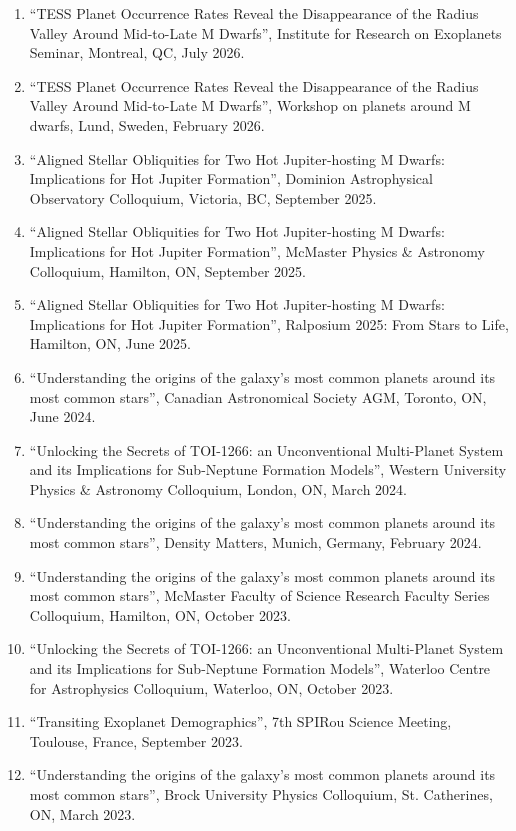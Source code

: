 \documentclass[12pt]{article}
\begin{document}
\begin{enumerate}
\item ``TESS Planet Occurrence Rates Reveal the Disappearance of the Radius Valley Around Mid-to-Late M Dwarfs'', Institute for Research on Exoplanets Seminar, Montreal, QC, July 2026.
\item ``TESS Planet Occurrence Rates Reveal the Disappearance of the Radius Valley Around Mid-to-Late M Dwarfs'', Workshop on planets around M dwarfs, Lund, Sweden, February 2026.
\item ``Aligned Stellar Obliquities for Two Hot Jupiter-hosting M Dwarfs: Implications for Hot Jupiter Formation'', Dominion Astrophysical Observatory Colloquium, Victoria, BC, September 2025.
\item ``Aligned Stellar Obliquities for Two Hot Jupiter-hosting M Dwarfs: Implications for Hot Jupiter Formation'', McMaster Physics \& Astronomy Colloquium, Hamilton, ON, September 2025.
\item ``Aligned Stellar Obliquities for Two Hot Jupiter-hosting M Dwarfs: Implications for Hot Jupiter Formation'', Ralposium 2025: From Stars to Life, Hamilton, ON, June 2025.
\item ``Understanding the origins of the galaxy’s most common planets around its most common stars'', Canadian Astronomical Society AGM, Toronto, ON, June 2024.
\item ``Unlocking the Secrets of TOI-1266: an Unconventional Multi-Planet System and its Implications for Sub-Neptune Formation Models'', Western University Physics \& Astronomy Colloquium, London, ON, March 2024.
\item ``Understanding the origins of the galaxy’s most common planets around its most common stars'', Density Matters, Munich, Germany, February 2024.
\item ``Understanding the origins of the galaxy’s most common planets around its most common stars'', McMaster Faculty of Science Research Faculty Series Colloquium, Hamilton, ON, October 2023.
\item ``Unlocking the Secrets of TOI-1266: an Unconventional Multi-Planet System and its Implications for Sub-Neptune Formation Models'', Waterloo Centre for Astrophysics Colloquium, Waterloo, ON, October 2023.
\item ``Transiting Exoplanet Demographics'', 7th SPIRou Science Meeting, Toulouse, France, September 2023.
\item ``Understanding the origins of the galaxy’s most common planets around its most common stars'', Brock University Physics Colloquium, St. Catherines, ON, March 2023.

\end{enumerate}
\end{document}
